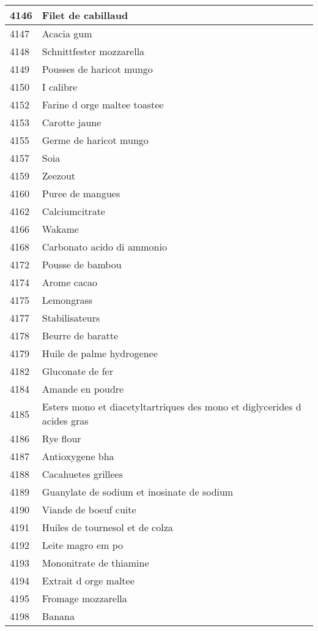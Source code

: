 \begin{longtable}{|l|l|}
4146 & Filet de cabillaud \\ \hline 
4147 & Acacia gum \\ \hline 
4148 & Schnittfester mozzarella \\ \hline 
4149 & Pousses de haricot mungo \\ \hline 
4150 & I calibre \\ \hline 
4152 & Farine d orge maltee toastee \\ \hline 
4153 & Carotte jaune \\ \hline 
4155 & Germe de haricot mungo \\ \hline 
4157 & Soia \\ \hline 
4159 & Zeezout \\ \hline 
4160 & Puree de mangues \\ \hline 
4162 & Calciumcitrate \\ \hline 
4166 & Wakame \\ \hline 
4168 & Carbonato acido di ammonio \\ \hline 
4172 & Pousse de bambou \\ \hline 
4174 & Arome cacao \\ \hline 
4175 & Lemongrass \\ \hline 
4177 & Stabilisateurs \\ \hline 
4178 & Beurre de baratte \\ \hline 
4179 & Huile de palme hydrogenee \\ \hline 
4182 & Gluconate de fer \\ \hline 
4184 & Amande en poudre \\ \hline 
4185 & Esters mono et diacetyltartriques des mono et diglycerides d acides gras \\ \hline 
4186 & Rye flour \\ \hline 
4187 & Antioxygene bha \\ \hline 
4188 & Cacahuetes grillees \\ \hline 
4189 & Guanylate de sodium et inosinate de sodium \\ \hline 
4190 & Viande de boeuf cuite \\ \hline 
4191 & Huiles de tournesol et de colza \\ \hline 
4192 & Leite magro em po \\ \hline 
4193 & Mononitrate de thiamine \\ \hline 
4194 & Extrait d orge maltee \\ \hline 
4195 & Fromage mozzarella \\ \hline 
4198 & Banana \\ \hline 

\end{longtable}
